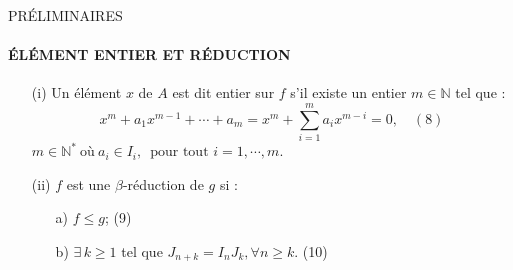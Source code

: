 \documentclass[11pt,a4paper]{beamer}
\begin{document}
%	
	\begin{frame}{PRÉLIMINAIRES}
		\framesubtitle{ÉLÉMENT ENTIER ET RÉDUCTION}
		\begin{block}{}
			\begin{enumerate}
				\item[(i)] Un élément $x$ de $A$ est dit entier sur $f$ s'il existe un entier $m \in \mathbb{N}$ tel que :
				\[ x^m + a_1 x^{m-1} + \cdots + a_m = x^m + \sum_{i=1}^{m} a_i x^{m-i} = 0, \quad (8) \]
				 $m \in \mathbb{N^*} \ \text{où} \ a_i \in I_i,\, \text{ pour tout } i=1, \cdots ,m.$
				\item[(ii)] $f$ est une $\beta$-réduction de $g$ si : \\
				\begin{enumerate}
					\item[a)] $f \leq g$; (9)
					\item[b)]  $\exists \, k \geq 1$ tel que $J_{n+k} = I_n J_k , \forall n \geq k$. (10)
				\end{enumerate}
			\end{enumerate}
		\end{block}
	\end{frame}
	
\end{document}
